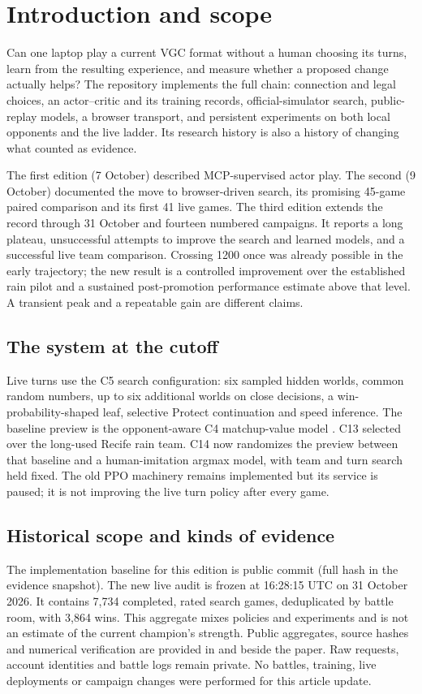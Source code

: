 \section{Introduction and scope}
\label{sec:scope}

Can one laptop play a current VGC format without a human choosing its turns,
learn from the resulting experience, and measure whether a proposed change
actually helps? The repository implements the full chain: connection and
legal choices, an actor--critic and its training records, official-simulator
search, public-replay models, a browser transport, and persistent experiments
on both local opponents and the live ladder. Its research history is also a
history of changing what counted as evidence.

The first edition (7 October) described MCP-supervised actor play. The second
(9 October) documented the move to browser-driven search, its promising
45-game paired comparison and its first 41 live games. The third edition
extends the record through 31 October and fourteen numbered campaigns. It
reports a long plateau, unsuccessful attempts to improve the search and
learned models, and a successful live team comparison. Crossing 1200 once was
already possible in the early trajectory; the new result is a controlled
improvement over the established rain pilot and a sustained post-promotion
performance estimate above that level. A transient peak and a repeatable gain
are different claims.

\subsection{The system at the cutoff}
Live turns use the C5 search configuration: six sampled hidden worlds, common
random numbers, up to six additional worlds on close decisions, a
win-probability-shaped leaf, selective Protect continuation and speed
inference. The baseline preview is the opponent-aware C4 matchup-value model
. C13 selected
 over the long-used Recife rain team. C14 now
randomizes the preview between that baseline and a human-imitation argmax
model, with team and turn search held fixed. The old PPO machinery remains
implemented but its service is paused; it is not improving the live turn
policy after every game.

\subsection{Historical scope and kinds of evidence}
The implementation baseline for this edition is public commit
 (full hash in the evidence snapshot). The new live audit is frozen
at 16:28:15 UTC on 31 October 2026. It contains 7,734 completed, rated search
games, deduplicated by battle room, with 3,864 wins. This aggregate mixes
policies and experiments and is not an estimate of the current champion's
strength. Public aggregates, source hashes and numerical verification are
provided in  and 
beside the paper. Raw requests, account identities and battle logs remain
private. No battles, training, live deployments or campaign changes were
performed for this article update.

